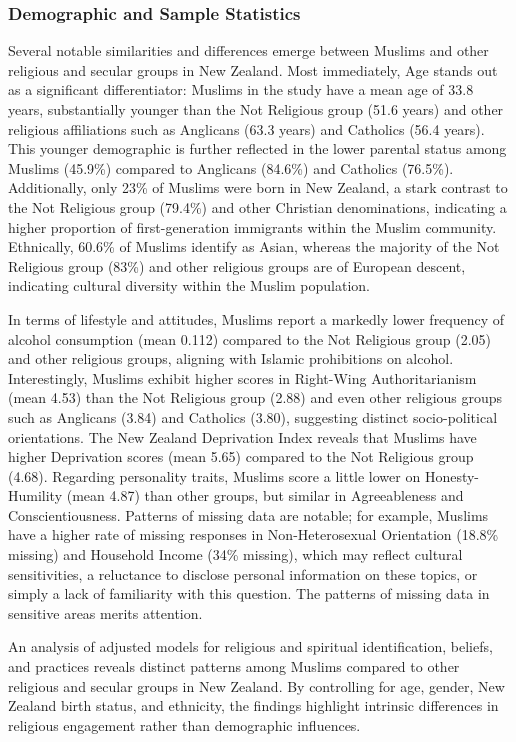 \documentclass[
  single column]{article}
\begin{document}
\subsubsection{Demographic and Sample
Statistics}\label{demographic-and-sample-statistics}

Several notable similarities and differences emerge between Muslims and
other religious and secular groups in New Zealand. Most immediately, Age
stands out as a significant differentiator: Muslims in the study have a
mean age of 33.8 years, substantially younger than the Not Religious
group (51.6 years) and other religious affiliations such as Anglicans
(63.3 years) and Catholics (56.4 years). This younger demographic is
further reflected in the lower parental status among Muslims (45.9\%)
compared to Anglicans (84.6\%) and Catholics (76.5\%). Additionally,
only 23\% of Muslims were born in New Zealand, a stark contrast to the
Not Religious group (79.4\%) and other Christian denominations,
indicating a higher proportion of first-generation immigrants within the
Muslim community. Ethnically, 60.6\% of Muslims identify as Asian,
whereas the majority of the Not Religious group (83\%) and other
religious groups are of European descent, indicating cultural diversity
within the Muslim population.

In terms of lifestyle and attitudes, Muslims report a markedly lower
frequency of alcohol consumption (mean 0.112) compared to the Not
Religious group (2.05) and other religious groups, aligning with Islamic
prohibitions on alcohol. Interestingly, Muslims exhibit higher scores in
Right-Wing Authoritarianism (mean 4.53) than the Not Religious group
(2.88) and even other religious groups such as Anglicans (3.84) and
Catholics (3.80), suggesting distinct socio-political orientations. The
New Zealand Deprivation Index reveals that Muslims have higher
Deprivation scores (mean 5.65) compared to the Not Religious group
(4.68). Regarding personality traits, Muslims score a little lower on
Honesty-Humility (mean 4.87) than other groups, but similar in
Agreeableness and Conscientiousness. Patterns of missing data are
notable; for example, Muslims have a higher rate of missing responses in
Non-Heterosexual Orientation (18.8\% missing) and Household Income (34\%
missing), which may reflect cultural sensitivities, a reluctance to
disclose personal information on these topics, or simply a lack of
familiarity with this question. The patterns of missing data in
sensitive areas merits attention.

An analysis of adjusted models for religious and spiritual
identification, beliefs, and practices reveals distinct patterns among
Muslims compared to other religious and secular groups in New Zealand.
By controlling for age, gender, New Zealand birth status, and ethnicity,
the findings highlight intrinsic differences in religious engagement
rather than demographic influences.
\end{document}
